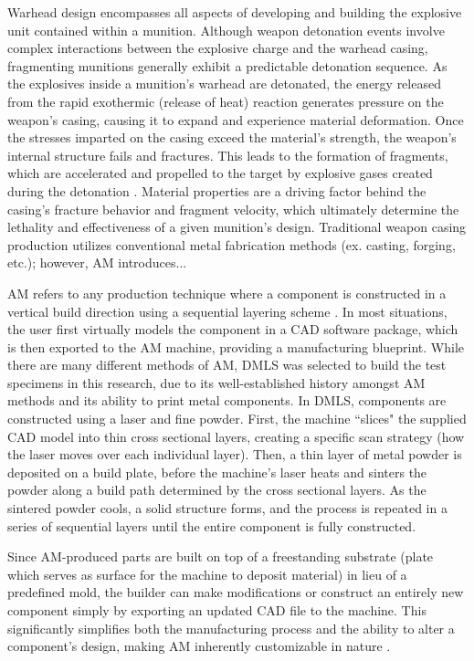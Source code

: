 Warhead design encompasses all aspects of developing and building the explosive unit contained within a munition. Although weapon detonation events involve complex interactions between the explosive charge and the warhead casing, fragmenting munitions generally exhibit a predictable detonation sequence. As the explosives inside a munition's warhead are detonated, the energy released from the rapid exothermic (release of heat) reaction generates pressure on the weapon’s casing, causing it to expand and experience material deformation. Once the stresses imparted on the casing exceed the material’s strength, the weapon’s internal structure fails and fractures. This leads to the formation of fragments, which are accelerated and propelled to the target by explosive gases created during the detonation \cite{Cooper1996}. Material properties are a driving factor behind the casing’s fracture behavior and fragment velocity, which ultimately determine the lethality and effectiveness of a given munition’s design. Traditional weapon casing production utilizes conventional metal fabrication methods (ex. casting, forging, etc.); however, \gls{AM} introduces...  


\gls{AM} refers to any production technique where a component is constructed in a vertical build direction using a sequential layering scheme \cite{OverviewofAM_OHara}. In most situations, the user first virtually models the component in a \gls{CAD} software package, which is then exported to the \gls{AM} machine, providing a manufacturing blueprint. While there are many different methods of \gls{AM}, \gls{DMLS} was selected to build the test specimens in this research, due to its well-established history amongst \gls{AM} methods and its ability to print metal components. In \gls{DMLS}, components are constructed using a laser and fine powder. First, the machine ``slices" the supplied \gls{CAD} model into thin cross sectional layers, creating a specific scan strategy (how the laser moves over each individual layer). Then, a thin layer of metal powder is deposited on a build plate, before the machine's laser heats and sinters the powder along a build path determined by the cross sectional layers. As the sintered powder cools, a solid structure forms, and the process is repeated in a series of sequential layers until the entire component is fully constructed.

Since \gls{AM}-produced parts are built on top of a freestanding substrate (plate which serves as surface for the machine to deposit material) in lieu of a predefined mold, the builder can make modifications or construct an entirely new component simply by exporting an updated \gls{CAD} file to the machine. This significantly simplifies both the manufacturing process and the ability to alter a component's design, making \gls{AM} inherently customizable in nature \cite{Furumoto}.
 
